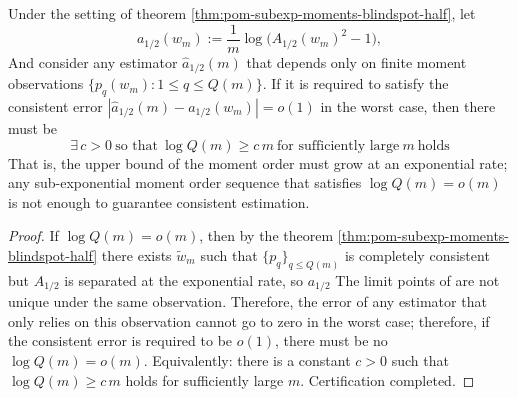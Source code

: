 \begin{proposition}\label{prop:pom-half-exponent-needs-exp-moment-order}
Under the setting of theorem \ref{thm:pom-subexp-moments-blindspot-half}, let
\[
a_{1/2}(w_m):=\frac{1}{m}\log\bigl(A_{1/2}(w_m)^2-1\bigr),
\]
And consider any estimator \(\widehat a_{1/2}(m)\) that depends only on finite moment observations \(\{p_q(w_m):1\le q\le Q(m)\}\).
If it is required to satisfy the consistent error \(|\widehat a_{1/2}(m)-a_{1/2}(w_m)|=o(1)\) in the worst case, then there must be
\[
\boxed{\;\exists\,c>0\ \text{so that}\ \log Q(m)\ge c\,m\ \text{for sufficiently large}\ m\ \text{holds}\;}
\]
That is, the upper bound of the moment order must grow at an exponential rate; any sub-exponential moment order sequence that satisfies \(\log Q(m)=o(m)\) is not enough to guarantee consistent estimation.
\end{proposition}
\begin{proof}
If \(\log Q(m)=o(m)\), then by the theorem \ref{thm:pom-subexp-moments-blindspot-half} there exists \(\widetilde w_m\) such that \(\{p_q\}_{q\le Q(m)}\) is completely consistent but \(A_{1/2}\) is separated at the exponential rate, so \(a_{1/2}\) The limit points of are not unique under the same observation.
Therefore, the error of any estimator that only relies on this observation cannot go to zero in the worst case; therefore, if the consistent error is required to be \(o(1)\), there must be no \(\log Q(m)=o(m)\). Equivalently: there is a constant \(c>0\) such that \(\log Q(m)\ge c\,m\) holds for sufficiently large \(m\). Certification completed.
\end{proof}

